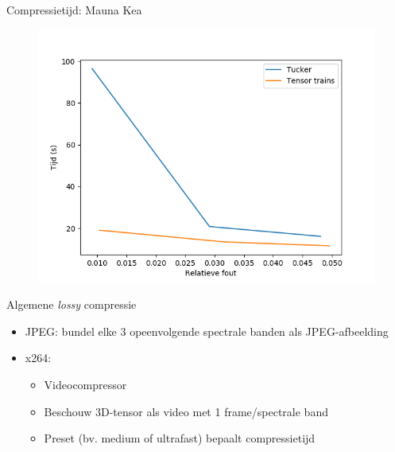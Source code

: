 \documentclass[t,12pt,dutch
\ifx\beamermode\undefined\else,\beamermode\fi
]{beamer}
\begin{document}
\begin{frame}{Compressietijd: Mauna Kea}

\begin{figure}[H]
\centering
\includegraphics[scale=0.5]{images/tucker_vs_tensor_trains_times_Mauna_Kea.png}
\end{figure}

\end{frame}

\begin{frame}{Algemene \textit{lossy} compressie}

\begin{itemize}
\item JPEG: bundel elke 3 opeenvolgende spectrale banden als JPEG-afbeelding
\item x264:
\begin{itemize}
\item Videocompressor
\item Beschouw 3D-tensor als video met 1 frame/spectrale band
\item Preset (bv. medium of ultrafast) bepaalt compressietijd
\end{itemize}
\end{itemize}

\end{frame}
\end{document}
